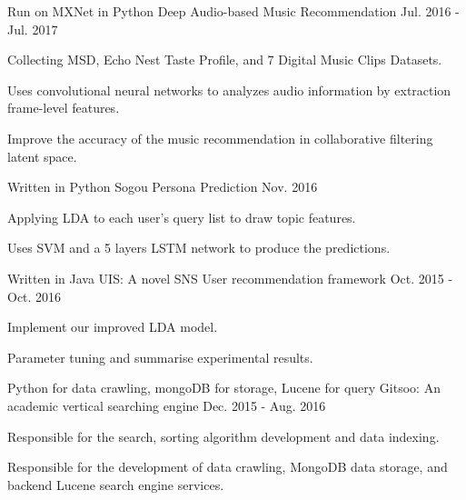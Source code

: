 \begin{cventries}
  \cventry
    {Run on MXNet in Python}
    {Deep Audio-based Music Recommendation}
    {}
    {Jul. 2016 - Jul. 2017}
    {
      \begin{cvitems}
        \item {Collecting MSD, Echo Nest Taste Profile, and 7 Digital Music Clips Datasets.}
        \item {Uses convolutional neural networks to analyzes audio information by extraction frame-level features.}
        \item {Improve the accuracy of the music recommendation in collaborative filtering latent space.}
      \end{cvitems}
    }
  \cventry
    {Written in Python}
    {Sogou Persona Prediction}
    {}
    {Nov. 2016}
    {
      \begin{cvitems}
        \item {Applying LDA to each user's query list to draw topic features.}
        \item {Uses SVM and a 5 layers LSTM network to produce the predictions.}
      \end{cvitems}
    }
  \cventry
    {Written in Java}
    {UIS: A novel SNS User recommendation framework}
    {}
    {Oct. 2015 - Oct. 2016}
    {
      \begin{cvitems}
        \item {Implement our improved LDA model.}
        \item {Parameter tuning and summarise experimental results.}
      \end{cvitems}
    }
  \cventry
    {Python for data crawling, mongoDB for storage, Lucene for query}
    {Gitsoo: An academic vertical searching engine}
    {}
    {Dec. 2015 - Aug. 2016}
    {
      \begin{cvitems}
        \item {Responsible for the search, sorting algorithm development and data indexing.}
        \item {Responsible for the development of data crawling, MongoDB data storage, and backend Lucene search engine services.}
      \end{cvitems}
    }
\end{cventries}